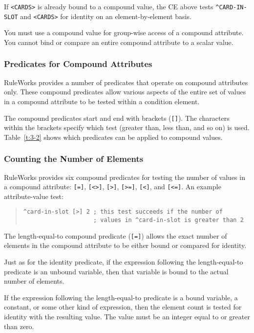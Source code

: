 If \verb|<CARDS>| is already bound to a compound value, the CE above
tests \verb|^CARD-IN-SLOT| and \verb|<CARDS>| for identity on an
element-by-element basis.

You must use a compound value for group-wise access of a compound
attribute. You cannot bind or compare an entire compound attribute to
a scalar value.

\subsubsection{Predicates for Compound Attributes}

RuleWorks provides a number of predicates that operate on compound
attributes only. These compound predicates allow various aspects of
the entire set of values in a compound attribute to be tested within a
condition element.

The compound predicates start and end with brackets (\verb|[]|). The
characters within the brackets specify which test (greater than, less
than, and so on) is used. Table~\ref{t:3-2} shows which predicates can
be applied to compound values.

\subsubsection{Counting the Number of Elements}

RuleWorks provides six compound predicates for testing the number of
values in a compound attribute: \verb|[=]|, \verb|[<>]|, \verb|[>]|,
\verb|[>=]|, \verb|[<]|, and \verb|[<=]|.  An example attribute-value
test:
\begin{quote}
\begin{verbatim}
^card-in-slot [>] 2 ; this test succeeds if the number of
                    ; values in ^card-in-slot is greater than 2
\end{verbatim}
\end{quote}
                  
The length-equal-to compound predicate (\verb|[=]|) allows the exact
number of elements in the compound attribute to be either bound or
compared for identity.

Just as for the identity predicate, if the expression following the
length-equal-to predicate is an unbound variable, then that variable
is bound to the actual number of elements.

If the expression following the length-equal-to predicate is a bound
variable, a constant, or some other kind of expression, then the
element count is tested for identity with the resulting value. The
value must be an integer equal to or greater than zero.

